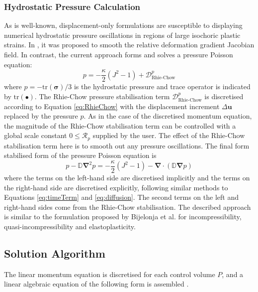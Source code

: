 \documentclass[sn-mathphys,Numbered,draft]{sn-jnl}%
\newcommand{\bb}{\boldsymbol}
\begin{document}
\subsubsection{Hydrostatic Pressure Calculation}
As is well-known, displacement-only formulations are susceptible to displaying numerical hydrostatic pressure oscillations in regions of large isochoric plastic strains.
In \citet{cardiff_lagrangian_2017}, it was proposed to smooth the relative deformation gradient Jacobian field.
In contrast, the current approach forms and solves a pressure Poisson equation:
\begin{equation}
	p = -\frac{\kappa}{2} (J^{2} - 1) + \mathcal{D}_{\text{Rhie-Chow}}^p
\end{equation}
where $p = - \text{tr}(\bb{\sigma})/3$ is the hydrostatic pressure and trace operator is indicated by $\text{tr}(\bullet)$.
The Rhie-Chow pressure stabilisation term $\mathcal{D}_{\text{Rhie-Chow}}^p$ is discretised according to Equation \ref{eq:RhieChow} with the displacement increment $\Delta \bb{u}$ replaced by the pressure $p$.
As in the case of the discretised momentum equation, the magnitude of the Rhie-Chow stabilisation term can be controlled with a global scale constant $0 \leq \mathcal{R}_p$ supplied by the user.
The effect of the Rhie-Chow stabilisation term here is to smooth out any pressure oscillations.
The final form stabilised form of the pressure Poisson equation is 
\begin{equation} \label{eq:pressureEqn}
	p - \mathbb{D} \bb{\nabla}^2 p = -\frac{\kappa}{2} (J^{2} - 1) - \bb{\nabla} \cdot \left( \mathbb{D} \bb{\nabla} p \right)
\end{equation}
where the terms on the left-hand side are discretised implicitly and the terms on the right-hand side are discretised explicitly, following similar methods to Equations \ref{eq:timeTerm} and \ref{eq:diffusion}.
The second terms on the left and right-hand sides come from the Rhie-Chow stabilisation.
The described approach is similar to the formulation proposed by Bijelonja et al. \cite{Bijelonja2002, Bijelonja2005a, Bijelonja2005b, Bijelonja2006} for incompressibility, quasi-incompressibility and elastoplasticity.

\subsection{Solution Algorithm}

The linear momentum equation is discretised for each control volume $P$, and a linear algebraic equation of the following form is assembled \cite{jasak_application_2000}.
\end{document}
